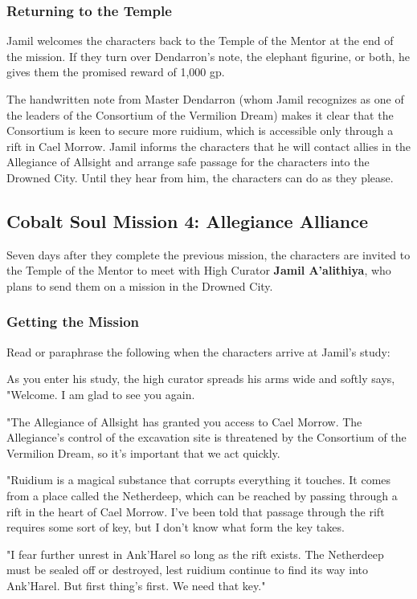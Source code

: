 \documentclass[10pt,a4paper,twoside,fancy,bg=print,twocolumn,openany,nodeprecatedcode]{dndbook}
\begin{document}
\subsubsection{Returning to the Temple}
Jamil welcomes the characters back to the Temple of the Mentor at the end of the mission. If they turn over Dendarron's note, the elephant figurine, or both, he gives them the promised reward of 1,000 gp.

The handwritten note from Master Dendarron (whom Jamil recognizes as one of the leaders of the Consortium of the Vermilion Dream) makes it clear that the Consortium is keen to secure more ruidium, which is accessible only through a rift in Cael Morrow. Jamil informs the characters that he will contact allies in the Allegiance of Allsight and arrange safe passage for the characters into the Drowned City. Until they hear from him, the characters can do as they please.

\subsection{Cobalt Soul Mission 4: Allegiance Alliance}
Seven days after they complete the previous mission, the characters are invited to the Temple of the Mentor to meet with High Curator \textbf{Jamil A'alithiya}, who plans to send them on a mission in the Drowned City.

\subsubsection{Getting the Mission}
Read or paraphrase the following when the characters arrive at Jamil's study:

\begin{DndReadAloud}{}
As you enter his study, the high curator spreads his arms wide and softly says, "Welcome. I am glad to see you again.

"The Allegiance of Allsight has granted you access to Cael Morrow. The Allegiance's control of the excavation site is threatened by the Consortium of the Vermilion Dream, so it's important that we act quickly.

"Ruidium is a magical substance that corrupts everything it touches. It comes from a place called the Netherdeep, which can be reached by passing through a rift in the heart of Cael Morrow. I've been told that passage through the rift requires some sort of key, but I don't know what form the key takes.

"I fear further unrest in Ank'Harel so long as the rift exists. The Netherdeep must be sealed off or destroyed, lest ruidium continue to find its way into Ank'Harel. But first thing's first. We need that key."

\end{DndReadAloud}
\end{document}
